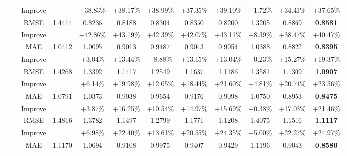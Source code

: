 \begin{table*}[t]
{\begin{tabular}{|c|c|c||c|c|c|c|c|c||c|c||c|}
\multirow{16}{*}{} &\multirow{4}{*}{}& {Improve} & {} & {+38.83\%} & {+38.17\%} & {+38.99\%} & {+37.35\%}  & {+39.10\%} & {+1.72\%} &{+34.41\%} & {+37.65\%} \\
\cline{3-12}
\multirow{16}{*}{} &\multirow{4}{*}{}& {RMSE}    & {1.4414} & {0.8236}   &{0.8188} & {0.8304}   & {0.8350}   &  {0.8200}   & {1.3205}   & {0.8869} &{\textbf{0.8581}} \\
\multirow{16}{*}{} &\multirow{4}{*}{}& {Improve} & {} & {+42.86\%} & {+43.19\%} & {+42.39\%} & {+42.07\%}  & {+43.11\%} & {+8.39\%} &{+38.47\%} & {+40.47\%} \\
\hline
\hline
\multirow{16}{*}{Yelp}& \multirow{4}{*}{90\%} & {MAE} & {1.0412} & {1.0095}   &{0.9013} & {0.9487}   & {0.9043}   &  {0.9054}    & {1.0388}   & {0.8822} &{\textbf{0.8395}} \\
\multirow{16}{*}{} &\multirow{4}{*}{}& {Improve} & {} & {+3.04\%} & {+13.44\%} & {+8.88\%} & {+13.15\%}  & {+13.04\%} & {+0.23\%} &{+15.27\%} & {+19.37\%} \\
\cline{3-12}
\multirow{16}{*}{} &\multirow{4}{*}{}& {RMSE}             & {1.4268} & {1.3392}   &{1.1417} & {1.2549}   & {1.1637}   &  {1.1186}    & {1.3581}  & {1.1309}  &{\textbf{1.0907}}\\
\multirow{16}{*}{} &\multirow{4}{*}{}& {Improve} & {} & {+6.14\%} & {+19.98\%} & {+12.05\%} & {+18.44\%}  & {+21.60\%} & {+4.81\%} &{+20.74\%} & {+23.56\%} \\
\cline{2-12}
\multirow{16}{*}{} &\multirow{4}{*}{}\multirow{4}{*}{80\%} & {MAE} & {1.0791} & {1.0373}   &{0.9038} & {0.9654}   & {0.9176}   &  {0.9098}   & {1.0750}   & {0.8953}  &{\textbf{0.8475}} \\
\multirow{16}{*}{} &\multirow{4}{*}{}& {Improve} & {} & {+3.87\%} & {+16.25\%} & {+10.54\%} & {+14.97\%}  & {+15.69\%} & {+0.38\%} &{+17.03\%} & {+21.46\%} \\
\cline{3-12}
\multirow{16}{*}{} &\multirow{4}{*}{}& {RMSE}    & {1.4816} & {1.3782}   &{1.1497} & {1.2799}   & {1.1771}   &  {1.1208}   & {1.4075}   & {1.1516} &{\textbf{1.1117}}\\
\multirow{16}{*}{} &\multirow{4}{*}{}& {Improve} & {} & {+6.98\%} & {+22.40\%} & {+13.61\%} & {+20.55\%}  & {+24.35\%} & {+5.00\%} &{+22.27\%} & {+24.97\%} \\
\cline{2-12}
\multirow{16}{*}{} &\multirow{4}{*}{}\multirow{4}{*}{70\%} & {MAE} & {1.1170} & {1.0694}   &{0.9108} & {0.9975}   & {0.9407}   &  {0.9429}   & {1.1196}  & {0.9043} &{\textbf{0.8580}}\\

\end{tabular}}
\end{table*}

